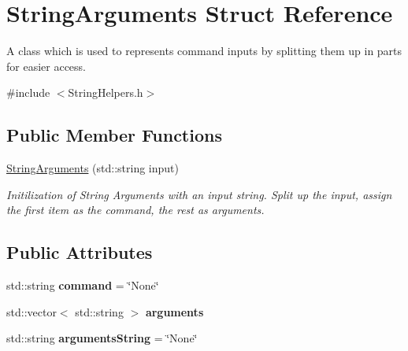 \hypertarget{structStringArguments}{}\section{String\+Arguments Struct Reference}
\label{structStringArguments}


A class which is used to represents command inputs by splitting them up in parts for easier access.  




{\ttfamily \#include $<$String\+Helpers.\+h$>$}

\subsection*{Public Member Functions}
\begin{DoxyCompactItemize}
\item 
\mbox{\label{structStringArguments_a6dbd90e4d504c2e997f328b81ab96cab}} 
\hyperlink{structStringArguments_a6dbd90e4d504c2e997f328b81ab96cab}{String\+Arguments} (std\+::string input)
\begin{DoxyCompactList}\small\item\em Initilization of String Arguments with an input string. Split up the input, assign the first item as the command, the rest as arguments. \end{DoxyCompactList}\end{DoxyCompactItemize}
\subsection*{Public Attributes}
\begin{DoxyCompactItemize}
\item 
\mbox{\label{structStringArguments_a2a7aa83de32d05bbd0ca4c547bc1cca1}} 
std\+::string {\bfseries command} = \char`\"{}None\char`\"{}
\item 
\mbox{\label{structStringArguments_a7fe6bf79c0968db7e54f1a9f4c3c60e8}} 
std\+::vector$<$ std\+::string $>$ {\bfseries arguments}
\item 
\mbox{\label{structStringArguments_a53cec051f6d2e740ee0e58df79594de1}} 
std\+::string {\bfseries arguments\+String} = \char`\"{}None\char`\"{}
\end{DoxyCompactItemize}


